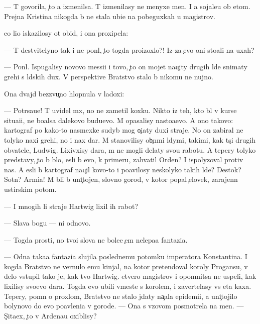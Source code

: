 \documentclass[10pt]{book}
\begin{document}
— T{\yi} govorila, {\c}to {\y}a izmenilsa. T{\yi} izmenilasy ne menyxe men{\ia}. I {\y}a sojale{\y}u ob etom. Prejn{\ia}{\y}a Kristina nikogda b{\yi} ne stala ubi{\y}{\q}e{\y} na pobeguxkah u magistrov.

{\Y}e{\y}o li{\q}o iskazilosy ot obid{\yi}, i ona proxipela:

— T{\yi} de{\y}stvitelyno tak i ne pon{\ia}l, {\c}to togda proizoxlo?! Iz-za {\c}evo oni sto{\y}ali na uxah?

— Pon{\ia}l. Ispugalisy novovo messi{\y}i i tovo, {\c}to on mojet nau{\c}ity drugih l{\iu}de{\y} snimaty grehi s l{\iu}dskih dux. V perspektive Bratstvo stalo b{\yi} nikomu ne nujno.

Ona dvajd{\yi} bezzvu{\c}no hlopnula v ladoxi:

— Potr{\ia}sa{\y}u{\x}e! T{\yi} uvidel m{\yi}x, no ne zametil koxku. Nikto iz teh, kto b{\yi}l v kurse situa{\q}i{\y}i, ne bo{\y}alsa dalekovo budu{\x}evo. M{\yi} opasalisy nasto{\y}a{\x}evo. A ono takovo: kartograf po kako{\y}-to nasmexke sudyb{\yi} mog o{\c}i{\x}aty duxi straje{\y}. No on zabiral ne tolyko naxi grehi, no i nax dar. M{\yi} stanovilisy ob{\yi}{\c}n{\yi}mi l{\iu}dymi, takimi, kak t{\yi}s{\ia}{\c}i drugih ob{\yi}vatele{\y}, Ludwig. Lixivxisy dara, m{\yi} ne mogli delaty svo{\y}u rabotu. A tepery tolyko predstavy, {\c}to b{\yi} b{\yi}lo, {\y}esli b{\yi} {\y}evo, k primeru, zahvatil Orden? I ispolyzoval protiv nas. A {\y}esli b{\yi} kartograf nau{\c}il kovo-to i po{\y}avilosy neskolyko takih l{\iu}de{\y}? Des{\ia}tok? Sotn{\ia}? Armi{\y}a! M{\yi} b{\yi}li b{\yi} uni{\c}tojen{\yi}, slovno gorod, v kotor{\yi}{\y} popal {\c}elovek, zarajenn{\yi}{\y} {\y}ustirskim potom.

— I mnogih li straje{\y} Hartwig lixil ih rabot{\yi}?

— Slava bogu — ni odnovo.

— Togda prosti, no tvo{\y}i slova ne bole{\y}e {\c}em nelepa{\y}a fantazi{\y}a.

— Odna taka{\y}a fantazi{\y}a slujila poslednemu potomku imperatora Konstantina. I kogda Bratstvo ne vernulo {\y}emu kinjal, na kotor{\yi}{\y} pretendoval koroly Progansu, v delo vstupil tako{\y} je, kak tvo{\y} Hartwig. {\C}etvero magistrov i opomnitsa ne uspeli, kak lixilisy svo{\y}evo dara. Togda {\y}evo ubili vmeste s korolem, i zavertelasy vs{\ia} eta kaxa. Tepery, pomn{\ia} o proxlom, Bratstvo ne stalo jdaty na{\c}ala epidemi{\y}i, a uni{\c}tojilo bolynovo do {\y}evo po{\y}avleni{\y}a v gorode. — Ona s v{\yi}zovom posmotrela na men{\ia}. — S{\c}ita{\y}ex, {\c}to v Ardenau oxiblisy?
\end{document}
